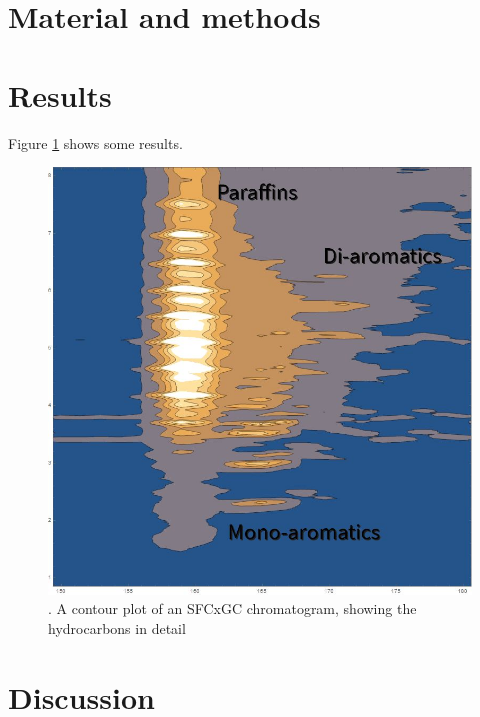 \documentclass[preprint,12pt]{elsarticle}
\begin{document}



\section{Material and methods}


    
\section{Results}

Figure \ref{fig:Aromatics} shows some results.

\begin{figure}[h]
\centering\includegraphics[width=0.4\linewidth]{Aromatics}
\caption{\label{fig:Aromatics}. A contour plot of an SFCxGC chromatogram, showing the hydrocarbons in detail}
\end{figure}

    
\section{Discussion}
\end{document}
